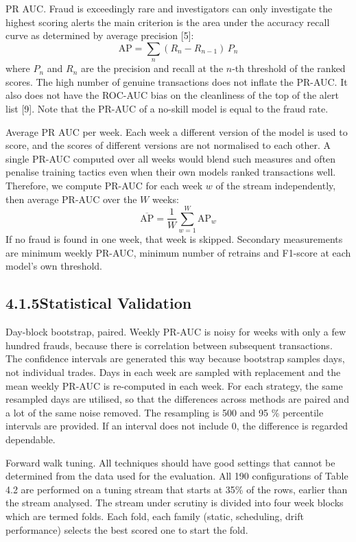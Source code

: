 \documentclass[11pt,letterpaper]{report}
\begin{document}
PR AUC. Fraud is exceedingly rare and investigators can only investigate the highest scoring alerts the main criterion is the area under the accuracy recall curve as determined by average precision [5]:
\begin{equation*}
  \mathrm{AP} = \sum_{n} (R_n - R_{n-1})\,P_n \tag{4.4}
\end{equation*}
where $P_n$ and $R_n$ are the precision and recall at the $n$-th threshold of the ranked scores. The high number of genuine transactions does not inflate the PR-AUC. It also does not have the ROC-AUC bias on the cleanliness of the top of the alert list [9]. Note that the PR-AUC of a no-skill model is equal to the fraud rate.

Average PR AUC per week. Each week a different version of the model is used to score, and the scores of different versions are not normalised to each other. A single PR-AUC computed over all weeks would blend such measures and often penalise training tactics even when their own models ranked transactions well. Therefore, we compute PR-AUC for each week $w$ of the stream independently, then average PR-AUC over the $W$ weeks:
\begin{equation*}
  \overline{\mathrm{AP}} = \frac{1}{W} \sum_{w=1}^{W} \mathrm{AP}_w \tag{4.5}
\end{equation*}
If no fraud is found in one week, that week is skipped. Secondary measurements are minimum weekly PR-AUC, minimum number of retrains and F1-score at each model's own threshold.

\subsection*{4.1.5\quad Statistical Validation}

Day-block bootstrap, paired. Weekly PR-AUC is noisy for weeks with only a few hundred frauds, because there is correlation between subsequent transactions. The confidence intervals are generated this way because bootstrap samples days, not individual trades. Days in each week are sampled with replacement and the mean weekly PR-AUC is re-computed in each week. For each strategy, the same resampled days are utilised, so that the differences across methods are paired and a lot of the same noise removed. The resampling is 500 and 95 \% percentile intervals are provided. If an interval does not include 0, the difference is regarded dependable.

Forward walk tuning. All techniques should have good settings that cannot be determined from the data used for the evaluation. All 190 configurations of Table 4.2 are performed on a tuning stream that starts at 35\% of the rows, earlier than the stream analysed. The stream under scrutiny is divided into four week blocks which are termed folds. Each fold, each family (static, scheduling, drift performance) selects the best scored one to start the fold.
\end{document}
